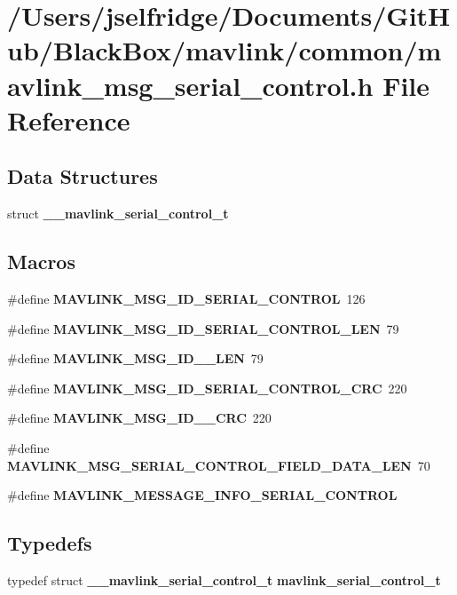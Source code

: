 \section{/\+Users/jselfridge/\+Documents/\+Git\+Hub/\+Black\+Box/mavlink/common/mavlink\+\_\+msg\+\_\+serial\+\_\+control.h File Reference}
\label{mavlink__msg__serial__control_8h}
\subsection*{Data Structures}
\begin{DoxyCompactItemize}
\item 
struct \textbf{ \+\_\+\+\_\+mavlink\+\_\+serial\+\_\+control\+\_\+t}
\end{DoxyCompactItemize}
\subsection*{Macros}
\begin{DoxyCompactItemize}
\item 
\#define \textbf{ M\+A\+V\+L\+I\+N\+K\+\_\+\+M\+S\+G\+\_\+\+I\+D\+\_\+\+S\+E\+R\+I\+A\+L\+\_\+\+C\+O\+N\+T\+R\+OL}~126
\item 
\#define \textbf{ M\+A\+V\+L\+I\+N\+K\+\_\+\+M\+S\+G\+\_\+\+I\+D\+\_\+\+S\+E\+R\+I\+A\+L\+\_\+\+C\+O\+N\+T\+R\+O\+L\+\_\+\+L\+EN}~79
\item 
\#define \textbf{ M\+A\+V\+L\+I\+N\+K\+\_\+\+M\+S\+G\+\_\+\+I\+D\+\_\+\_\+\+L\+EN}~79
\item 
\#define \textbf{ M\+A\+V\+L\+I\+N\+K\+\_\+\+M\+S\+G\+\_\+\+I\+D\+\_\+\+S\+E\+R\+I\+A\+L\+\_\+\+C\+O\+N\+T\+R\+O\+L\+\_\+\+C\+RC}~220
\item 
\#define \textbf{ M\+A\+V\+L\+I\+N\+K\+\_\+\+M\+S\+G\+\_\+\+I\+D\+\_\+\_\+\+C\+RC}~220
\item 
\#define \textbf{ M\+A\+V\+L\+I\+N\+K\+\_\+\+M\+S\+G\+\_\+\+S\+E\+R\+I\+A\+L\+\_\+\+C\+O\+N\+T\+R\+O\+L\+\_\+\+F\+I\+E\+L\+D\+\_\+\+D\+A\+T\+A\+\_\+\+L\+EN}~70
\item 
\#define \textbf{ M\+A\+V\+L\+I\+N\+K\+\_\+\+M\+E\+S\+S\+A\+G\+E\+\_\+\+I\+N\+F\+O\+\_\+\+S\+E\+R\+I\+A\+L\+\_\+\+C\+O\+N\+T\+R\+OL}
\end{DoxyCompactItemize}
\subsection*{Typedefs}
\begin{DoxyCompactItemize}
\item 
typedef struct \textbf{ \+\_\+\+\_\+mavlink\+\_\+serial\+\_\+control\+\_\+t} \textbf{ mavlink\+\_\+serial\+\_\+control\+\_\+t}
\end{DoxyCompactItemize}


